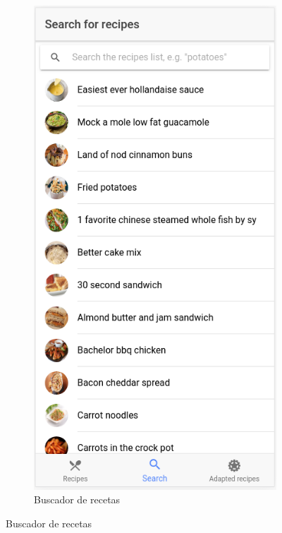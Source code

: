 \begin{figure}[H]
\begin{subfigure}[b]{0.32\linewidth}
        \label{fig:app_5}
    \end{subfigure}
    \begin{subfigure}[b]{0.319\linewidth}
        \includegraphics[width=\linewidth]{imagenes/app/pantallas/app_6.png}
        \caption{Buscador de recetas}

\end{subfigure}
\end{figure}
